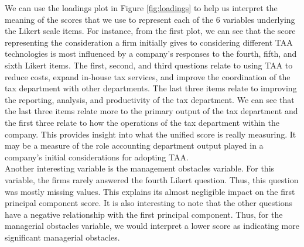\documentclass[12pt]{article}
\begin{document}
We can use the loadings plot in Figure \ref{fig:loadings} to help us interpret the meaning of the scores that we use to represent each of the 6 variables underlying the Likert scale items. For instance, from the first plot, we can see that the score representing the consideration a firm initially gives to considering different TAA technologies is most influenced by a company's responses to the fourth, fifth, and sixth Likert items. The first, second, and third questions relate to using TAA to reduce costs, expand in-house tax services, and improve the coordination of the tax department with other departments. The last three items relate to improving the reporting, analysis, and productivity of the tax department. We can see that the last three items relate more to the primary output of the tax department and the first three relate to how the operations of the tax department within the company. This provides insight into what the unified score is really measuring. It may be a measure of the role accounting department output played in a company's initial considerations for adopting TAA. \\

Another interesting variable is the management obstacles variable. For this variable, the firms rarely answered the fourth Likert question. Thus, this question was mostly missing values. This explains its almost negligible impact on the first principal component score. It is also interesting to note that the other questions have a negative relationship with the first principal component. Thus, for the managerial obstacles variable, we would interpret a lower score as indicating more significant managerial obstacles. 
\end{document}

